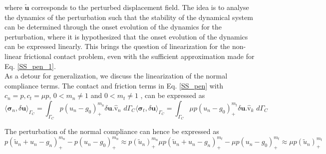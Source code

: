  where $\bm{\widetilde{u}}$ corresponds to the perturbed displacement field. The idea is to analyse the dynamics of the perturbation such that the stability of the dynamical system can be determined through the onset evolution of the dynamics for the perturbation, where it is hypothesized that the onset evolution of the dynamics can be expressed linearly. This brings the question of linearization for the non-linear frictional contact problem, even with the sufficient approximation made for Eq. \eqref{SS_pen_1}.\\

 As a detour for generalization, we discuss the linearization of the normal compliance terms. The contact and friction terms in Eq. \eqref{SS_pen} with $c_n=p, c_t=\mu p$, $0< m_n \neq 1$  and $0< m_t \neq 1$ , can be expressed as\\ 
 
 \begin{subequations}\label{genli}
 \begin{equation}
 {\langle \bm{\sigma}_n, \delta \bm u \rangle_{\Gamma_C}}=\int_{\Gamma_C} \mathit{p}(u_n-g_0)^{m_n}_+\delta \bm{u}.\bm{\hat{\mathrm v}}_n \,\, d\Gamma_C
  \end{equation}
  \begin{equation}
  {\langle \bm{\sigma}_t, \delta \bm u \rangle_{\Gamma_C}}= \int_{\Gamma_C} \mu\mathit{p}(u_n-g_0)^{m_t}_+\delta \bm{u}.\bm{\hat{\mathrm v}}_k \,\, d\Gamma_C
  \end{equation}
 \end{subequations}
 
 
 
 The perturbation of the normal compliance can hence be expressed as\\
 
  \begin{subequations}
 \begin{equation}
 \mathit{p}(\widetilde{u}_n+u_n-g_n)^{m_n}_+- \mathit{p}(u_n-g_0)^{m_n}_+\approx \mathit{p}(\widetilde{u}_n)^{m_n}_+
   \end{equation}
    \begin{equation}
 \mu\mathit{p}(\widetilde{u}_n+u_n-g_n)^{m_t}_+- \mu\mathit{p}(u_n-g_0)^{m_t}_+\approx \mu\mathit{p}(\widetilde{u}_n)^{m_t}_+
    \end{equation}
  \end{subequations}
  
